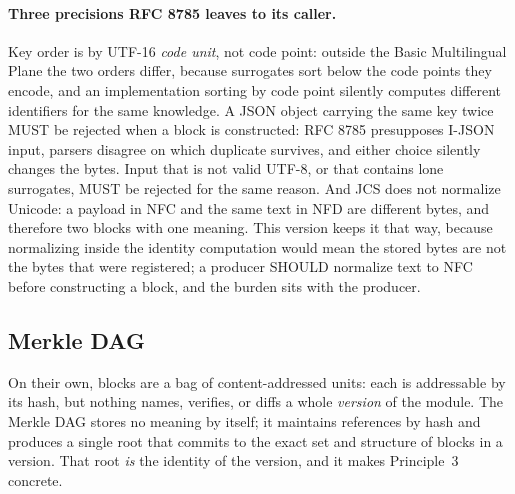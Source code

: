\documentclass[11pt,a4paper]{article}
\begin{document}
\paragraph{Three precisions RFC 8785 leaves to its caller.}
Key order is by UTF-16 \emph{code unit}, not code point: outside the Basic
Multilingual Plane the two orders differ, because surrogates sort below the
code points they encode, and an implementation sorting by code point silently
computes different identifiers for the same knowledge. A JSON object carrying
the same key twice MUST be rejected when a block is constructed: RFC 8785
presupposes I-JSON input, parsers disagree on which duplicate survives, and
either choice silently changes the bytes. Input that is not valid UTF-8, or
that contains lone surrogates, MUST be rejected for the same reason. And JCS
does not normalize Unicode: a payload in NFC and the same text in NFD are
different bytes, and therefore two blocks with one meaning. This version keeps
it that way, because normalizing inside the identity computation would mean
the stored bytes are not the bytes that were registered; a producer SHOULD
normalize text to NFC before constructing a block, and the burden sits with
the producer.

\subsection{Merkle DAG}
\label{sec:merkle}

On their own, blocks are a bag of content-addressed units: each is addressable
by its hash, but nothing names, verifies, or diffs a whole \emph{version} of
the module. The Merkle DAG stores no meaning by itself; it maintains
references by hash and produces a single root that commits to the exact set
and structure of blocks in a version. That root \emph{is} the identity of the
version, and it makes Principle~3 concrete.
\end{document}
